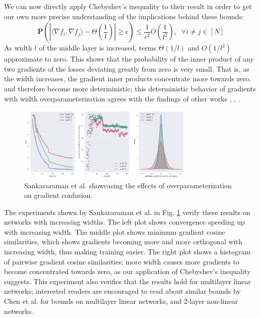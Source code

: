 \documentclass{article}
\begin{document}
We can now directly apply Chebyshev's inequality to their result in order to get our own more precise understanding of the implications behind these bounds:
$$\boxed{\mathbf{P}\left( \left\lvert \langle \nabla f_i, \nabla f_j \rangle - \Theta(\frac{1}{l}) \right\rvert \geq \epsilon  \right) \leq \frac{1}{\epsilon^2}O(\frac{1}{l^2}), \;\; \forall i \not = j \in [N]}$$
As width $l$ of the middle layer is increased, terms $\Theta(1/l)$ and $O(1/l^2)$ approximate to zero. This shows that the probability of the inner product of any two gradients of the losses deviating greatly from zero is very small. That is, as the width increases, the gradient inner products concentrate more towards zero, and therefore become more deterministic; this deterministic behavior of gradients with width overparameterization agrees with the findings of other works \cite{oymak}, \cite{bassily}, \cite{SimonDu}.\\

\begin{figure}[h]
	\centering
    \includegraphics[width=0.75\textwidth]{pics/overparameterization/grad_consine_sim.png}
	\caption{Sankararaman et al. \cite{gradient_confusion} showcasing the effects of overparameterization on gradient confusion.}
	\label{fig:grad_cosine_sim}
\end{figure}

The experiments shown by Sankararaman et al. \cite{gradient_confusion} in Fig. \ref{fig:grad_cosine_sim} verify these results on networks with increasing widths. The left plot shows convergence speeding up with increasing width. The middle plot shows minimum gradient cosine similarities, which shows gradients becoming more and more orthogonal with increasing width, thus making training easier. The right plot shows a histogram of pairwise gradient cosine similarities; more width causes more gradients to become concentrated towards zero, as our application of Chebyshev's inequality suggests. This experiment also verifies that the results hold for multilayer linear networks; interested readers are encouraged to read about similar bounds by Chen et al. \cite{chen} for bounds on multilayer linear networks, and 2-layer non-linear networks.
\end{document}
